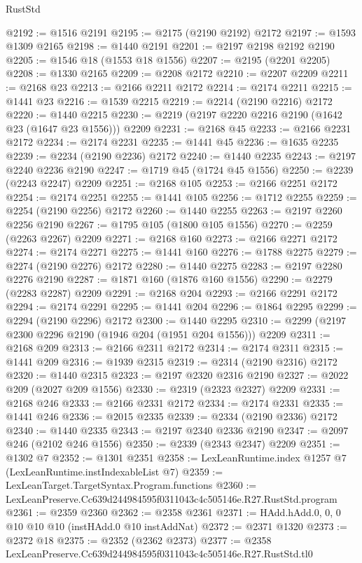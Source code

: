 \begin{lexlean}{RustStd}
\begin{coremodule}
@2192 := @1516 @2191
@2195 := @2175 (@2190 @2192) @2172
@2197 := @1593 @1309 @2165
@2198 := @1440 @2191
@2201 := @2197 @2198 @2192 @2190
@2205 := @1546 @18 (@1553 @18 @1556)
@2207 := @2195 (@2201 @2205)
@2208 := @1330 @2165
@2209 := @2208 @2172
@2210 := @2207 @2209
@2211 := @2168 @23
@2213 := @2166 @2211 @2172
@2214 := @2174 @2211
@2215 := @1441 @23
@2216 := @1539 @2215
@2219 := @2214 (@2190 @2216) @2172
@2220 := @1440 @2215
@2230 := @2219 (@2197 @2220 @2216 @2190 (@1642 @23 (@1647 @23 @1556))) @2209
@2231 := @2168 @45
@2233 := @2166 @2231 @2172
@2234 := @2174 @2231
@2235 := @1441 @45
@2236 := @1635 @2235
@2239 := @2234 (@2190 @2236) @2172
@2240 := @1440 @2235
@2243 := @2197 @2240 @2236 @2190
@2247 := @1719 @45 (@1724 @45 @1556)
@2250 := @2239 (@2243 @2247) @2209
@2251 := @2168 @105
@2253 := @2166 @2251 @2172
@2254 := @2174 @2251
@2255 := @1441 @105
@2256 := @1712 @2255
@2259 := @2254 (@2190 @2256) @2172
@2260 := @1440 @2255
@2263 := @2197 @2260 @2256 @2190
@2267 := @1795 @105 (@1800 @105 @1556)
@2270 := @2259 (@2263 @2267) @2209
@2271 := @2168 @160
@2273 := @2166 @2271 @2172
@2274 := @2174 @2271
@2275 := @1441 @160
@2276 := @1788 @2275
@2279 := @2274 (@2190 @2276) @2172
@2280 := @1440 @2275
@2283 := @2197 @2280 @2276 @2190
@2287 := @1871 @160 (@1876 @160 @1556)
@2290 := @2279 (@2283 @2287) @2209
@2291 := @2168 @204
@2293 := @2166 @2291 @2172
@2294 := @2174 @2291
@2295 := @1441 @204
@2296 := @1864 @2295
@2299 := @2294 (@2190 @2296) @2172
@2300 := @1440 @2295
@2310 := @2299 (@2197 @2300 @2296 @2190 (@1946 @204 (@1951 @204 @1556))) @2209
@2311 := @2168 @209
@2313 := @2166 @2311 @2172
@2314 := @2174 @2311
@2315 := @1441 @209
@2316 := @1939 @2315
@2319 := @2314 (@2190 @2316) @2172
@2320 := @1440 @2315
@2323 := @2197 @2320 @2316 @2190
@2327 := @2022 @209 (@2027 @209 @1556)
@2330 := @2319 (@2323 @2327) @2209
@2331 := @2168 @246
@2333 := @2166 @2331 @2172
@2334 := @2174 @2331
@2335 := @1441 @246
@2336 := @2015 @2335
@2339 := @2334 (@2190 @2336) @2172
@2340 := @1440 @2335
@2343 := @2197 @2340 @2336 @2190
@2347 := @2097 @246 (@2102 @246 @1556)
@2350 := @2339 (@2343 @2347) @2209
@2351 := @1302 @7
@2352 := @1301 @2351
@2358 := LexLeanRuntime.index @1257 @7 (LexLeanRuntime.instIndexableList @7)
@2359 := LexLeanTarget.TargetSyntax.Program.functions
@2360 := LexLeanPreserve.Cc639d244984595f0311043c4c505146e.R27.RustStd.program
@2361 := @2359 @2360
@2362 := @2358 @2361
@2371 := HAdd.hAdd.{0, 0, 0} @10 @10 @10 (instHAdd.{0} @10 instAddNat)
@2372 := @2371 @1320
@2373 := @2372 @18
@2375 := @2352 (@2362 @2373)
@2377 := @2358 LexLeanPreserve.Cc639d244984595f0311043c4c505146e.R27.RustStd.tl0

\end{coremodule}
\end{lexlean}
